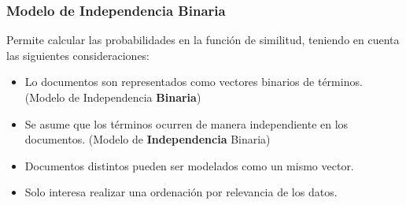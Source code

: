 \documentclass[
10pt, %
aspectratio=169, %
]{beamer}
\begin{document}
	\begin{frame}
		
		\frametitle{Modelo de Independencia Binaria}
		
		Permite calcular las probabilidades en la función de similitud, teniendo en cuenta las siguientes consideraciones:
		
		\begin{itemize}
			
			\item Lo documentos son representados como vectores binarios de términos. (Modelo de Independencia \textbf{Binaria}) \\[2mm]
			
			\item Se asume que los términos ocurren de manera independiente en los documentos. (Modelo de \textbf{Independencia} Binaria) \\[2mm]
			
			\item Documentos distintos pueden ser modelados como un mismo vector. \\[2mm]
			
			\item Solo interesa realizar una ordenación por relevancia de los datos.
			
		\end{itemize}
		
	\end{frame}
	
\end{document}
